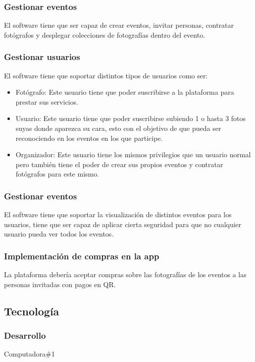 \documentclass[a4paper, 12pt]{article}
\begin{document}
			\subsubsection{Gestionar eventos}
				El software tiene que ser capaz de crear eventos, invitar personas, contratar fotógrafos y desplegar colecciones de fotografías dentro del evento.
			\subsubsection{Gestionar usuarios}
				El software tiene que soportar distintos tipos de usuarios como ser:
				\begin{itemize}
				\item Fotógrafo: Este usuario tiene que poder suscribirse a la plataforma para prestar sus servicios.
				
				\item Usuario: Este usuario tiene que poder suscribirse subiendo 1 o hasta 3 fotos suyas donde aparezca su cara, esto con el objetivo de que pueda ser reconociendo en los eventos en los que participe.
				
				\item Organizador: Este usuario tiene los mismos privilegios que un usuario normal pero también tiene el poder de crear sus propios eventos y contratar fotógrafos para este mismo.
				\end{itemize}
			\subsubsection{Gestionar eventos}
				El software tiene que soportar la visualización de distintos eventos para los usuarios, tiene que ser capaz de aplicar cierta seguridad para que no cualquier usuario pueda ver todos los eventos.
			\subsubsection{Implementación de compras en la app}
				La plataforma debería aceptar compras sobre las fotografías de los eventos a las personas invitadas con pagos en QR.
		\subsection{Tecnología}
			\subsubsection{Desarrollo}
				Computadora\#1
				
\end{document}
